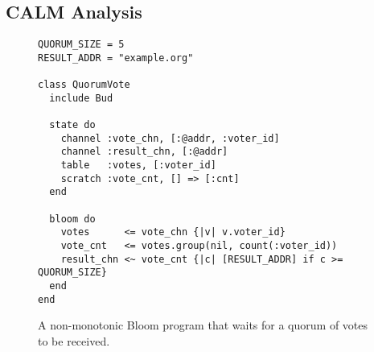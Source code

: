 \subsection{CALM Analysis}
\label{sec:bg-calm}

\begin{figure}[t]
\begin{scriptsize}
\begin{lstlisting}
QUORUM_SIZE = 5
RESULT_ADDR = "example.org"

class QuorumVote
  include Bud

  state do
    channel :vote_chn, [:@addr, :voter_id]
    channel :result_chn, [:@addr]
    table   :votes, [:voter_id]
    scratch :vote_cnt, [] => [:cnt]
  end

  bloom do
    votes      <= vote_chn {|v| v.voter_id}
    vote_cnt   <= votes.group(nil, count(:voter_id))
    result_chn <~ vote_cnt {|c| [RESULT_ADDR] if c >= QUORUM_SIZE}
  end
end
\end{lstlisting}
\end{scriptsize}
\caption{A non-monotonic Bloom program that waits for a quorum of votes to be received.}
\label{fig:bloom-nm-quorum}
\end{figure}
